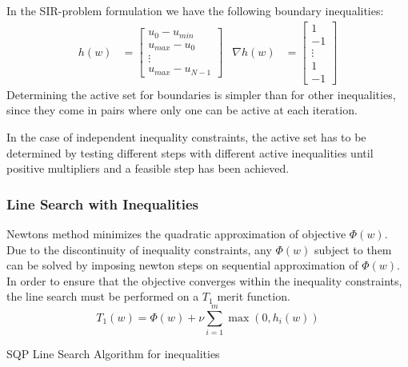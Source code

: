 In the SIR-problem formulation we have the following boundary inequalities:
\begin{align}
    h(w) &= \begin{bmatrix} u_0-u_{min} \\ u_{max}-u_0 \\ \vdots \\
u_{max}-u_{N-1}
    \end{bmatrix} & \nabla h(w) &= \begin{bmatrix} 1 \\ -1 \\ \vdots \\1\\
-1
    \end{bmatrix}
\end{align}
Determining the active set for boundaries is simpler than for other inequalities, since they come in pairs where only one can be active at each iteration.

In the case of independent inequality constraints, the active set has to be determined by testing different steps with different active inequalities until positive multipliers and a feasible step has been achieved.

\subsubsection{Line Search with Inequalities}
Newtons method minimizes the quadratic approximation of objective $\Phi(w)$. Due to the discontinuity of inequality constraints, any $\Phi(w)$ subject to them can be solved by imposing newton steps on sequential approximation of $\Phi(w)$. In order to ensure that the objective converges within the inequality constraints, the line search must be performed on a $T_1$ merit function.
\begin{equation}
    T_1(w) = \Phi(w) + \nu \sum_{i=1}^m \max(0, h_i(w))
\end{equation}

\begin{algorithm}[H]
\SetAlgoLined
{}

 \caption{SQP Line Search Algorithm for inequalities}
 \label{alg:SQP_Linesearch}
\end{algorithm}



